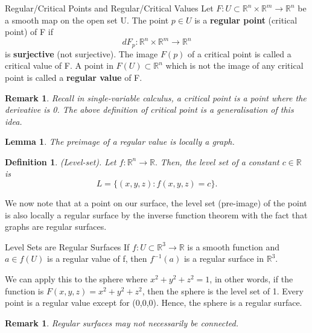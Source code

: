 \documentclass[twoside]{article}
\newtheorem{lemma}[theorem]{Lemma}
\newtheorem{definition}[theorem]{Definition}
\newtheorem{remark}[theorem]{Remark}
\begin{document}
\begin{definition_exam}{Regular/Critical Points and Regular/Critical Values}{} Let $F: U \subset \mathbb{R}^n \times \mathbb{R}^m \rightarrow \mathbb{R}^n$ be a smooth map on the open set U. The point $p \in U$ is a \textbf{regular point} (critical point) of F if
$$
dF_p: \mathbb{R}^n \times \mathbb{R}^m \rightarrow \mathbb{R}^n
$$
is \textbf{surjective} (not surjective). The image $F(p)$ of a critical point is called a critical value of F. A point in $F(U) \subset \mathbb{R}^n$ which is not the image of any critical point is called a \textbf{regular value} of F.
\end{definition_exam}

\begin{remark}Recall in single-variable calculus, a critical point is a point where the derivative is 0. The above definition of critical point is a generalisation of this idea.
\end{remark}


\begin{lemma}The preimage of a regular value is locally a graph.
\end{lemma}


\begin{definition}(Level-set). Let $f: \mathbb{R}^n \rightarrow \mathbb{R}.$ Then, the level set of a constant $c \in \mathbb{R}$ is 
$$
L = \{(x,y,z): f(x,y,z) = c\}.
$$
\end{definition}

We now note that at a point on our surface, the level set (pre-image) of the point is also locally a regular surface by the inverse function theorem with the fact that graphs are regular surfaces.

\begin{proposition_exam}{Level Sets are Regular Surfaces}{} If $f: U \subset \mathbb{R}^3 \rightarrow \mathbb{R}$ is a smooth function and $a \in f(U)$ is a regular value of f, then $f^{-1}(a)$ is a regular surface in $\mathbb{R}^3.$
\end{proposition_exam}

We can apply this to the sphere where $x^2+y^2+z^2 = 1$, in other words, if the function is $F(x,y,z) = x^2+y^2+z^2$, then the sphere is the level set of 1. Every point is a regular value except for (0,0,0). Hence, the sphere is a regular surface.\\ 
\begin{remark}Regular surfaces may not necessarily be connected.
\end{remark}
\end{document}
